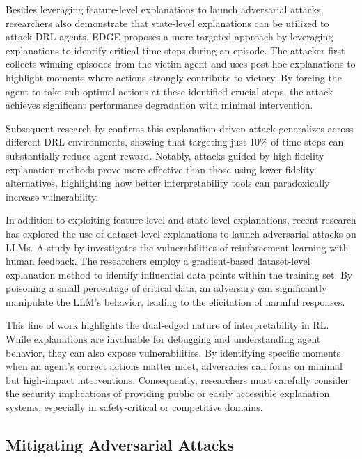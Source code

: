 Besides leveraging feature-level explanations to launch adversarial attacks, researchers also demonstrate that state-level explanations can be utilized to attack DRL agents. EDGE \citep{guo2021edge} proposes a more targeted approach by leveraging explanations to identify critical time steps during an episode. The attacker first collects winning episodes from the victim agent and uses post-hoc explanations to highlight moments where actions strongly contribute to victory. By forcing the agent to take sub-optimal actions at these identified crucial steps, the attack achieves significant performance degradation with minimal intervention.


Subsequent research by \citet{cheng2023statemask} confirms this explanation-driven attack generalizes across different DRL environments, showing that targeting just 10\% of time steps can substantially reduce agent reward. Notably, attacks guided by high-fidelity explanation methods prove more effective than those using lower-fidelity alternatives, highlighting how better interpretability tools can paradoxically increase vulnerability.

In addition to exploiting feature-level and state-level explanations, recent research has explored the use of dataset-level explanations to launch adversarial attacks on LLMs. A study by \citet{wang2024rlhfpoison} investigates the vulnerabilities of reinforcement learning with human feedback. The researchers employ a gradient-based dataset-level explanation method to identify influential data points within the training set. By poisoning a small percentage of critical data, an adversary can significantly manipulate the LLM's behavior, leading to the elicitation of harmful responses. 

This line of work highlights the dual-edged nature of interpretability in RL. While explanations are invaluable for debugging and understanding agent behavior, they can also expose vulnerabilities. By identifying specific moments when an agent's correct actions matter most, adversaries can focus on minimal but high-impact interventions. Consequently, researchers must carefully consider the security implications of providing public or easily accessible explanation systems, especially in safety-critical or competitive domains.

\subsection{Mitigating Adversarial Attacks}

